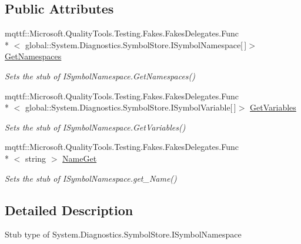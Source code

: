 \subsection*{Public Attributes}
\begin{DoxyCompactItemize}
\item 
mqttf\-::\-Microsoft.\-Quality\-Tools.\-Testing.\-Fakes.\-Fakes\-Delegates.\-Func\\*
$<$ global\-::\-System.\-Diagnostics.\-Symbol\-Store.\-I\-Symbol\-Namespace\mbox{[}$\,$\mbox{]}$>$ \hyperlink{class_system_1_1_diagnostics_1_1_symbol_store_1_1_fakes_1_1_stub_i_symbol_namespace_a96a2cbcb89dea9d21ea6a902462c8de7}{Get\-Namespaces}
\begin{DoxyCompactList}\small\item\em Sets the stub of I\-Symbol\-Namespace.\-Get\-Namespaces()\end{DoxyCompactList}\item 
mqttf\-::\-Microsoft.\-Quality\-Tools.\-Testing.\-Fakes.\-Fakes\-Delegates.\-Func\\*
$<$ global\-::\-System.\-Diagnostics.\-Symbol\-Store.\-I\-Symbol\-Variable\mbox{[}$\,$\mbox{]}$>$ \hyperlink{class_system_1_1_diagnostics_1_1_symbol_store_1_1_fakes_1_1_stub_i_symbol_namespace_aa3696fe4f4970b20c879d201dd471c97}{Get\-Variables}
\begin{DoxyCompactList}\small\item\em Sets the stub of I\-Symbol\-Namespace.\-Get\-Variables()\end{DoxyCompactList}\item 
mqttf\-::\-Microsoft.\-Quality\-Tools.\-Testing.\-Fakes.\-Fakes\-Delegates.\-Func\\*
$<$ string $>$ \hyperlink{class_system_1_1_diagnostics_1_1_symbol_store_1_1_fakes_1_1_stub_i_symbol_namespace_a30fe8de4860a9ce20e249c3a89d4db2f}{Name\-Get}
\begin{DoxyCompactList}\small\item\em Sets the stub of I\-Symbol\-Namespace.\-get\-\_\-\-Name()\end{DoxyCompactList}\end{DoxyCompactItemize}


\subsection{Detailed Description}
Stub type of System.\-Diagnostics.\-Symbol\-Store.\-I\-Symbol\-Namespace



